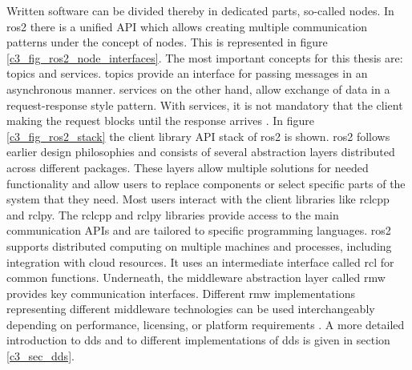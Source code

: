 Written software can be divided thereby in dedicated parts, so-called \glspl{node}. In \gls{ros2} there is a unified API which allows creating multiple communication patterns under the concept of \glspl{node}. This is represented in figure \ref{c3_fig_ros2_node_interfaces}. The most important concepts for this thesis are: \glspl{topic} and \glspl{service}. \Glspl{topic} provide an interface for passing \glspl{message} in an asynchronous manner. \Glspl{service} on the other hand, allow exchange of data in a request-response style pattern. With \glspl{service}, it is not mandatory that the client making the request blocks until the response arrives \cite{rico_concise_2022, macenski_robot_2022}.\newline
In figure \ref{c3_fig_ros2_stack} the client library API stack of \gls{ros2} is shown. \gls{ros2} follows earlier design philosophies and consists of several abstraction layers distributed across different packages. These layers allow multiple solutions for needed functionality and allow users to replace components or select specific parts of the system that they need. Most users interact with the client libraries like \gls{rclcpp} and \gls{rclpy}. The \gls{rclcpp} and \gls{rclpy} libraries provide access to the main communication APIs and are tailored to specific programming languages. \gls{ros2} supports distributed computing on multiple machines and processes, including integration with cloud resources. It uses an intermediate interface called \gls{rcl} for common functions. Underneath, the middleware abstraction layer called \gls{rmw} provides key communication interfaces. Different \gls{rmw} implementations representing different middleware technologies can be used interchangeably depending on performance, licensing, or platform requirements \cite{rico_concise_2022, macenski_robot_2022, liao_introduction_2020,macenski_robot_2022, noauthor_ros_nodate-1, noauthor_eprosima_nodate}. \newline
A more detailed introduction to \gls{dds} and to different implementations of \gls{dds} is given in section \ref{c3_sec_dds}.
